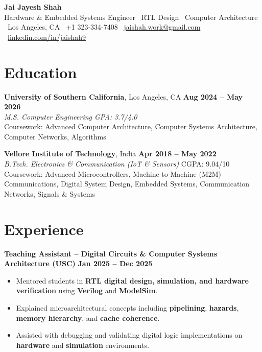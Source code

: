 \documentclass[letterpaper,11pt]{article}
\begin{document}
\begin{center}
    {\LARGE \textbf{Jai Jayesh Shah}}\\
   {\normalsize Hardware \& Embedded Systems Engineer \textbar\ RTL Design \textbar\ Computer Architecture}\\
\small
    \faMapMarker*\ Los Angeles, CA
    \quad
    \faPhone*\ +1 323-334-7408
    \quad
    \faEnvelope\ \href{mailto:jaishah.work@gmail.com} {jaishah.work@gmail.com}
    \quad
    \faLinkedin\ \href{https://www.linkedin.com/in/jaishah9} {linkedin.com/in/jaishah9}
\end{center}
\vspace{-13pt}

\section*{Education}

\textbf{University of Southern California}, Los Angeles, CA \hfill \textbf{Aug 2024 -- May 2026} \\
\textit{M.S. Computer Engineering \hfill GPA: 3.7/4.0 }\\
Coursework: Advanced Computer Architecture, Computer Systems Architecture, Computer Networks, Algorithms

\vspace{4pt}

\textbf{Vellore Institute of Technology}, India \hfill \textbf{Apr 2018 -- May 2022} \\
\textit{B.Tech. Electronics \& Communication (IoT \& Sensors) }\hfill CGPA: 9.04/10 \\
Coursework: Advanced Microcontrollers, Machine-to-Machine (M2M) Communications, Digital System Design, Embedded Systems, Communication Networks, Signals \& Systems

\section*{Experience}

\textbf{Teaching Assistant – Digital Circuits \& Computer Systems Architecture (USC)} \hfill \textbf{Jan 2025 -- Dec 2025} \\
\begin{itemize}
\item Mentored students in \textbf{RTL digital design, simulation, and hardware verification} using \textbf{Verilog} and \textbf{ModelSim}.
\item Explained microarchitectural concepts including \textbf{pipelining}, \textbf{hazards}, \textbf{memory hierarchy}, and \textbf{cache coherence}.
\item Assisted with debugging and validating digital logic implementations on \textbf{hardware} and \textbf{simulation} environments.
\end{itemize}
\end{document}
